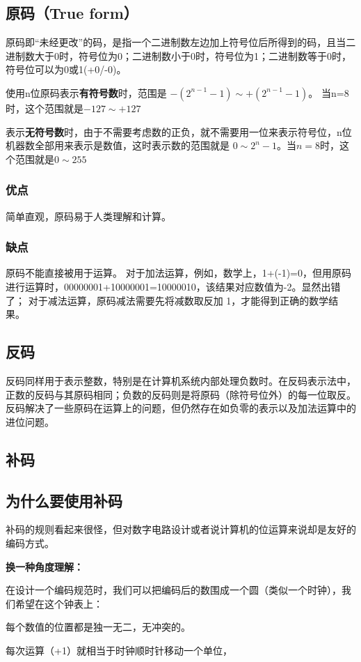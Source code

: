 \begin{issues}
\issueDraft
\end{issues}


\subsection{原码（True form）}

原码即“未经更改”的码，是指一个二进制数左边加上符号位后所得到的码，且当二进制数大于0时，符号位为0；二进制数小于0时，符号位为1；二进制数等于0时，符号位可以为0或1(+0/-0)。

使用n位原码表示\textbf{有符号数}时，范围是 $-(2^{n-1}-1)\sim +(2^{n-1}-1)$。 当n=8时，这个范围就是$-127\sim +127 $

表示\textbf{无符号数}时，由于不需要考虑数的正负，就不需要用一位来表示符号位，n位机器数全部用来表示是数值，这时表示数的范围就是
$0\sim 2^{n}-1$。当$n=8$时，这个范围就是$0\sim 255$

\subsubsection{优点}

简单直观，原码易于人类理解和计算。

\subsubsection{缺点}
原码不能直接被用于运算。
对于加法运算，例如，数学上，1+(-1)=0，但用原码进行运算时，00000001+10000001=10000010，该结果对应数值为-2。显然出错了；
对于减法运算，原码减法需要先将减数取反加 1，才能得到正确的数学结果。


\subsection{反码}

反码同样用于表示整数，特别是在计算机系统内部处理负数时。在反码表示法中，正数的反码与其原码相同；负数的反码则是将原码（除符号位外）的每一位取反。反码解决了一些原码在运算上的问题，但仍然存在如负零的表示以及加法运算中的进位问题。

\subsection{补码}

\subsection{为什么要使用补码}

补码的规则看起来很怪，但对数字电路设计或者说计算机的位运算来说却是友好的编码方式。

\textbf{换一种角度理解：}

在设计一个编码规范时，我们可以把编码后的数围成一个圆（类似一个时钟），我们希望在这个钟表上：

每个数值的位置都是独一无二，无冲突的。

每次运算（+1）就相当于时钟顺时针移动一个单位，







